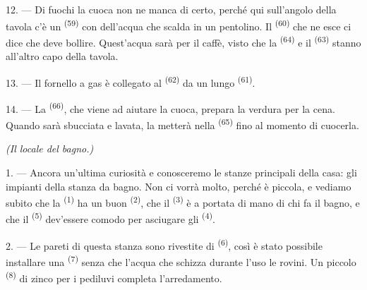 12. --- Di fuochi la cuoca non ne manca di certo, perché qui sull'angolo della tavola
c'è un  \textsuperscript{(59)} con dell'acqua che scalda in un
pentolino. Il  \textsuperscript{(60)} che ne esce ci dice che deve
bollire. Quest'acqua sarà per il caffè, visto che la 
\textsuperscript{(64)} e il  \textsuperscript{(63)} stanno all'altro
capo della tavola.

13. --- Il fornello a gas è collegato al 
\textsuperscript{(62)} da un lungo  \textsuperscript{(61)}.

14. --- La  \textsuperscript{(66)}, che viene ad aiutare la cuoca,
prepara la verdura per la cena. Quando sarà sbucciata e lavata, la metterà nella
 \textsuperscript{(65)} fino al momento di cuocerla.

\VUsaut{4.0mm}
{\centering\fontsize{10.2pt}{10.2pt}\selectfont{} \textit{(Il locale del bagno.)}\par}
\VUsaut{3.0mm}

1. --- Ancora un'ultima curiosità e conosceremo le stanze principali della casa: gli
impianti della stanza da bagno. Non ci vorrà molto, perché è piccola, e vediamo subito
che la  \textsuperscript{(1)} ha un buon 
\textsuperscript{(2)}, che il  \textsuperscript{(3)} è a portata di
mano di chi fa il bagno, e che il  \textsuperscript{(5)}
dev'essere comodo per asciugare gli  \textsuperscript{(4)}.

2. --- Le pareti di questa stanza sono rivestite di 
\textsuperscript{(6)}, così è stato possibile installare una 
\textsuperscript{(7)} senza che l'acqua che schizza durante l'uso le rovini. Un piccolo
 \textsuperscript{(8)} di zinco per i pediluvi completa
l'arredamento.
\VUsaut{6.0mm}
\VUfilet{22mm}
